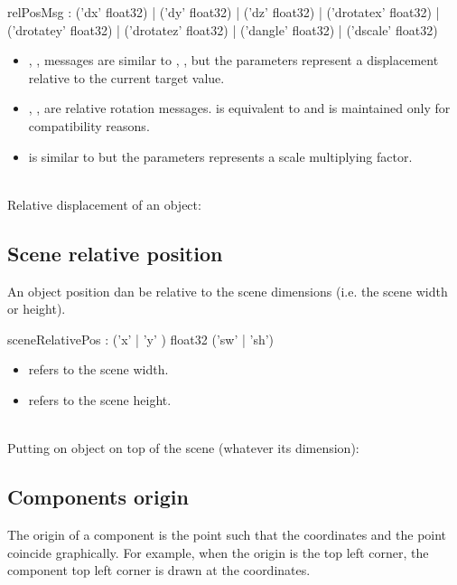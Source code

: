 \documentclass[a4paper,twoside]{report}
\newcommand{\subsublevel}[1]	{\subsection{#1}}
\begin{document}
\begin{rail}
relPosMsg :  
			('dx' float32)
		| 	('dy' float32)
		| 	('dz' float32)
		| 	('drotatex' float32)
		| 	('drotatey' float32)
		| 	('drotatez' float32)
		| 	('dangle' float32)
		| 	('dscale' float32) 
\end{rail}

\begin{itemize}
\item {}, ,  messages are similar to , ,  but the parameters represent a displacement relative to the current target value.
\item {}, ,  are relative rotation messages.  is equivalent to  and is maintained only for compatibility reasons.
\item {} is similar to  but the parameters represents a scale multiplying factor.
\end{itemize}

\example \\
Relative displacement of an object:

\subsublevel{Scene relative position}
\label{srelpos}

An object position dan be relative to the scene dimensions (i.e. the scene width or height).
\begin{rail}
sceneRelativePos :  
		('x' | 'y' ) float32 ('sw' | 'sh')
\end{rail}

\begin{itemize}
\item {} refers to the scene width.
\item {} refers to the scene height.
\end{itemize}

\example \\
Putting on object on top of the scene (whatever its dimension):


\subsublevel{Components origin}
\label{origin}

The origin of a component is the point  such that the  coordinates and the  point coincide graphically. For example, when the origin is the top left corner, the component top left corner is drawn  at the  coordinates.
\end{document}
